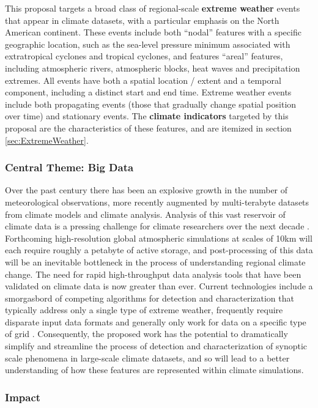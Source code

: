 \documentclass[11pt]{article}
\newcommand\citep{\cite}
\begin{document}
This proposal targets a broad class of regional-scale \textbf{extreme weather} events that appear in climate datasets, with a particular emphasis on the North American continent.  These events include both ``nodal'' features with a specific geographic location, such as the sea-level pressure minimum associated with extratropical cyclones and tropical cyclones, and features ``areal'' features, including atmospheric rivers, atmospheric blocks, heat waves and precipitation extremes.  All events have both a spatial location / extent and a temporal component, including a distinct start and end time.  Extreme weather events include both propagating events (those that gradually change spatial position over time) and stationary events.  The \textbf{climate indicators} targeted by this proposal are the characteristics of these features, and are itemized in section \ref{sec:ExtremeWeather}.

\subsubsection{Central Theme: Big Data}

Over the past century there has been an explosive growth in the number of meteorological observations, more recently augmented by multi-terabyte datasets from climate models and climate analysis.  Analysis of this vast reservoir of climate data is a pressing challenge for climate researchers over the next decade \citep{levy2012bigdata, ganguly2008data}.  Forthcoming high-resolution global atmospheric simulations at scales of 10km will each require roughly a petabyte of active storage, and post-processing of this data will be an inevitable bottleneck in the process of understanding regional climate change.  The need for rapid high-throughput data analysis tools that have been validated on climate data is now greater than ever.  Current technologies include a smorgasbord of competing algorithms for detection and characterization that typically address only a single type of extreme weather, frequently require disparate input data formats and generally only work for data on a specific type of grid \citep{neu2013imilast}.  Consequently, the proposed work has the potential to dramatically simplify and streamline the process of detection and characterization of synoptic scale phenomena in large-scale climate datasets, and so will lead to a better understanding of how these features are represented within climate simulations.

\subsubsection{Impact}
\end{document}
